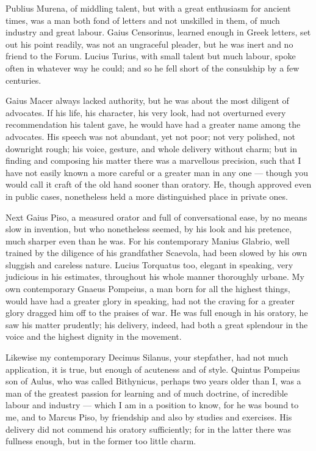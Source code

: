  Publius Murena, of middling talent, but with a great enthusiasm for ancient times, was a man both fond of letters and not unskilled in them, of much industry and great labour. Gaius Censorinus, learned enough in Greek letters, set out his point readily, was not an ungraceful pleader, but he was inert and no friend to the Forum. Lucius Turius, with small talent but much labour, spoke often in whatever way he could; and so he fell short of the consulship by a few centuries.

 Gaius Macer always lacked authority, but he was about the most diligent of advocates. If his life, his character, his very look, had not overturned every recommendation his talent gave, he would have had a greater name among the advocates. His speech was not abundant, yet not poor; not very polished, not downright rough; his voice, gesture, and whole delivery without charm; but in finding and composing his matter there was a marvellous precision, such that I have not easily known a more careful or a greater man in any one — though you would call it craft of the old hand sooner than oratory. He, though approved even in public cases, nonetheless held a more distinguished place in private ones.

 Next Gaius Piso, a measured orator and full of conversational ease, by no means slow in invention, but who nonetheless seemed, by his look and his pretence, much sharper even than he was. For his contemporary Manius Glabrio, well trained by the diligence of his grandfather Scaevola, had been slowed by his own sluggish and careless nature. Lucius Torquatus too, elegant in speaking, very judicious in his estimates, throughout his whole manner thoroughly urbane. My own contemporary Gnaeus Pompeius, a man born for all the highest things, would have had a greater glory in speaking, had not the craving for a greater glory dragged him off to the praises of war. He was full enough in his oratory, he saw his matter prudently; his delivery, indeed, had both a great splendour in the voice and the highest dignity in the movement.

 Likewise my contemporary Decimus Silanus, your stepfather, had not much application, it is true, but enough of acuteness and of style. Quintus Pompeius son of Aulus, who was called Bithynicus, perhaps two years older than I, was a man of the greatest passion for learning and of much doctrine, of incredible labour and industry — which I am in a position to know, for he was bound to me, and to Marcus Piso, by friendship and also by studies and exercises. His delivery did not commend his oratory sufficiently; for in the latter there was fullness enough, but in the former too little charm.

